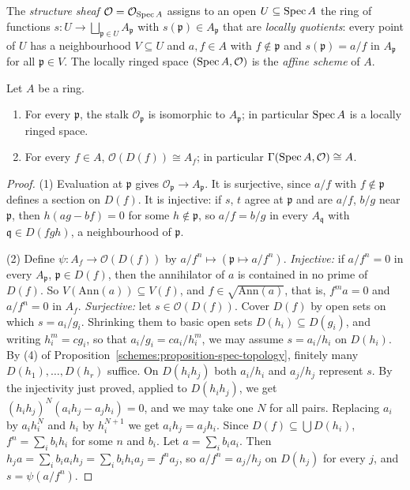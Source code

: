 \begin{definition}\label{schemes:definition-structure-sheaf}
The \emph{structure sheaf} $\mathcal{O} = \mathcal{O}_{\operatorname{Spec} A}$ assigns to an open $U \subseteq \operatorname{Spec} A$ the ring of functions
$s \colon U \to \bigsqcup_{\mathfrak{p} \in U}A_\mathfrak{p}$ with $s(\mathfrak{p}) \in A_\mathfrak{p}$ that are \emph{locally quotients}: every point of $U$ has a
neighbourhood $V \subseteq U$ and $a, f \in A$ with $f \notin \mathfrak{p}$ and $s(\mathfrak{p}) = a/f$ in $A_\mathfrak{p}$ for all $\mathfrak{p} \in V$. The
locally ringed space $(\operatorname{Spec} A, \mathcal{O})$ is the \emph{affine scheme} of $A$.
\end{definition}

\begin{theorem}\label{schemes:theorem-structure-sheaf}
Let $A$ be a ring.
\begin{enumerate}
\item For every $\mathfrak{p}$, the stalk $\mathcal{O}_\mathfrak{p}$ is isomorphic to $A_\mathfrak{p}$; in particular $\operatorname{Spec} A$ is a locally ringed space.
\item For every $f \in A$, $\mathcal{O}(D(f)) \cong A_f$; in particular $\Gamma(\operatorname{Spec} A, \mathcal{O}) \cong A$.
\end{enumerate}
\end{theorem}

\begin{proof}
(1) Evaluation at $\mathfrak{p}$ gives $\mathcal{O}_\mathfrak{p} \to A_\mathfrak{p}$. It is surjective, since $a/f$ with $f \notin \mathfrak{p}$ defines a section on
$D(f)$. It is injective: if $s$, $t$ agree at $\mathfrak{p}$ and are $a/f$, $b/g$ near $\mathfrak{p}$, then $h(ag - bf) = 0$ for some $h \notin \mathfrak{p}$, so
$a/f = b/g$ in every $A_\mathfrak{q}$ with $\mathfrak{q} \in D(fgh)$, a neighbourhood of $\mathfrak{p}$.

(2) Define $\psi \colon A_f \to \mathcal{O}(D(f))$ by $a/f^n \mapsto (\mathfrak{p} \mapsto a/f^n)$. \emph{Injective:} if $a/f^n = 0$ in every $A_\mathfrak{p}$,
$\mathfrak{p} \in D(f)$, then the annihilator of $a$ is contained in no prime of $D(f)$. So $V(\mathrm{Ann}(a)) \subseteq V(f)$, and $f \in \sqrt{\mathrm{Ann}(a)}$,
that is, $f^ma = 0$ and $a/f^n = 0$ in $A_f$. \emph{Surjective:} let $s \in \mathcal{O}(D(f))$. Cover $D(f)$ by open sets on which $s = a_i/g_i$. Shrinking
them to basic open sets $D(h_i) \subseteq D(g_i)$, and writing $h_i^m = cg_i$, so that $a_i/g_i = ca_i/h_i^m$, we may assume $s = a_i/h_i$ on $D(h_i)$. By
(4) of Proposition~\ref{schemes:proposition-spec-topology}, finitely many $D(h_1), \ldots, D(h_r)$ suffice. On $D(h_ih_j)$ both $a_i/h_i$ and $a_j/h_j$
represent $s$. By the injectivity just proved, applied to $D(h_ih_j)$, we get $(h_ih_j)^N(a_ih_j - a_jh_i) = 0$, and we may take one $N$ for all pairs.
Replacing $a_i$ by $a_ih_i^N$ and $h_i$ by $h_i^{N+1}$ we get $a_ih_j = a_jh_i$. Since $D(f) \subseteq \bigcup D(h_i)$, $f^n = \sum_ib_ih_i$ for some $n$ and
$b_i$. Let $a = \sum_ib_ia_i$. Then $h_ja = \sum_ib_ia_ih_j = \sum_ib_ih_ia_j = f^na_j$, so $a/f^n = a_j/h_j$ on $D(h_j)$ for every $j$, and $s = \psi(a/f^n)$.
\end{proof}

